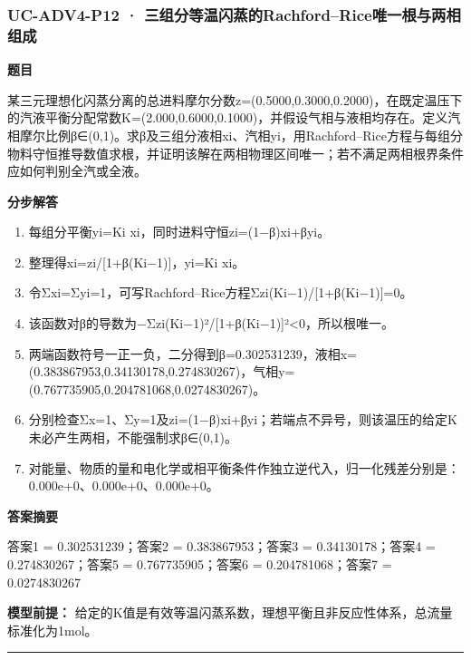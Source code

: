 \documentclass[UTF8,11pt,a4paper]{ctexart}
\begin{document}
\subsubsection*{UC-ADV4-P12 · 三组分等温闪蒸的Rachford–Rice唯一根与两相组成}
\noindent\textbf{题目}\par
某三元理想化闪蒸分离的总进料摩尔分数z=(0.5000,0.3000,0.2000)，在既定温压下的汽液平衡分配常数K=(2.000,0.6000,0.1000)，并假设气相与液相均存在。定义汽相摩尔比例β∈(0,1)。求β及三组分液相xi、汽相yi，用Rachford–Rice方程与每组分物料守恒推导数值求根，并证明该解在两相物理区间唯一；若不满足两相根界条件应如何判别全汽或全液。\par
\medskip\noindent\textbf{分步解答}
\begin{enumerate}
\item 每组分平衡yi=Ki xi，同时进料守恒zi=(1−β)xi+βyi。
\item 整理得xi=zi/[1+β(Ki−1)]，yi=Ki xi。
\item 令Σxi=Σyi=1，可写Rachford–Rice方程Σzi(Ki−1)/[1+β(Ki−1)]=0。
\item 该函数对β的导数为−Σzi(Ki−1)²/[1+β(Ki−1)]²<0，所以根唯一。
\item 两端函数符号一正一负，二分得到β=0.302531239，液相x=(0.383867953,0.34130178,0.274830267)，气相y=(0.767735905,0.204781068,0.0274830267)。
\item 分别检查Σx=1、Σy=1及zi=(1−β)xi+βyi；若端点不异号，则该温压的给定K未必产生两相，不能强制求β∈(0,1)。
\item 对能量、物质的量和电化学或相平衡条件作独立逆代入，归一化残差分别是：0.000e+0、0.000e+0、0.000e+0。
\end{enumerate}
\noindent\textbf{答案摘要}\par
答案1 = 0.302531239；答案2 = 0.383867953；答案3 = 0.34130178；答案4 = 0.274830267；答案5 = 0.767735905；答案6 = 0.204781068；答案7 = 0.0274830267\par
\noindent\textbf{模型前提：}
给定的K值是有效等温闪蒸系数，理想平衡且非反应性体系，总流量标准化为1mol。\par
\medskip\hrule\medskip
{}
\end{document}
